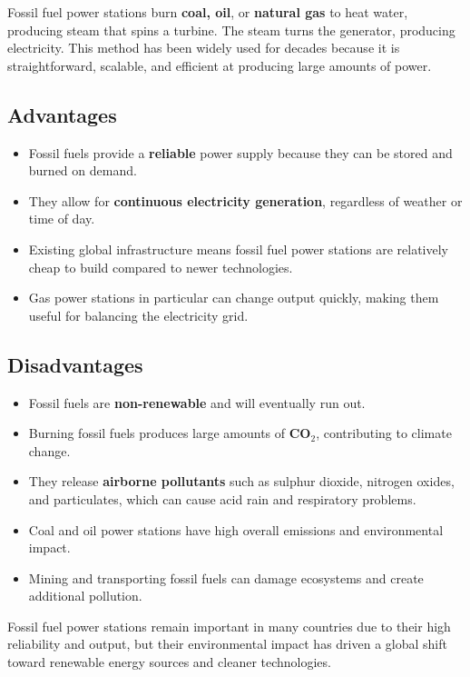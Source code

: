 \documentclass[12pt]{article}
\begin{document}
Fossil fuel power stations burn \textbf{coal, oil}, or \textbf{natural gas} to heat water, producing steam that spins a turbine. The steam turns the generator, producing electricity. This method has been widely used for decades because it is straightforward, scalable, and efficient at producing large amounts of power.

\subsection*{Advantages}

\begin{itemize}
    \item Fossil fuels provide a \textbf{reliable} power supply because they can be stored and burned on demand.
    \item They allow for \textbf{continuous electricity generation}, regardless of weather or time of day.
    \item Existing global infrastructure means fossil fuel power stations are relatively cheap to build compared to newer technologies.
    \item Gas power stations in particular can change output quickly, making them useful for balancing the electricity grid.
\end{itemize}

\subsection*{Disadvantages}

\begin{itemize}
    \item Fossil fuels are \textbf{non-renewable} and will eventually run out.
    \item Burning fossil fuels produces large amounts of \textbf{CO$_2$}, contributing to climate change.
    \item They release \textbf{airborne pollutants} such as sulphur dioxide, nitrogen oxides, and particulates, which can cause acid rain and respiratory problems.
    \item Coal and oil power stations have high overall emissions and environmental impact.
    \item Mining and transporting fossil fuels can damage ecosystems and create additional pollution.
\end{itemize}

Fossil fuel power stations remain important in many countries due to their high reliability and output, but their environmental impact has driven a global shift toward renewable energy sources and cleaner technologies.
\end{document}
